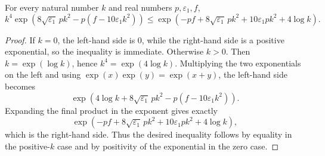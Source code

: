 \begin{helper}
For every natural number \(k\) and real numbers \(p,\varepsilon_1,f\),
\[
k^4\exp\!\left(
8\sqrt{\varepsilon_1}\,p k^2
-p(f-10\varepsilon_1 k^2)\right)
\le
\exp\!\left(
-pf+8\sqrt{\varepsilon_1}\,p k^2
+10\varepsilon_1 p k^2+4\log k\right).
\]
\end{helper}
\begin{proof}
If \(k=0\), the left-hand side is \(0\), while the right-hand side is a
positive exponential, so the inequality is immediate.  Otherwise \(k>0\).
Then \(k=\exp(\log k)\), hence \(k^4=\exp(4\log k)\).  Multiplying the two
exponentials on the left and using \(\exp(x)\exp(y)=\exp(x+y)\), the left-hand
side becomes
\[
\exp\!\left(
4\log k+8\sqrt{\varepsilon_1}\,p k^2
-p(f-10\varepsilon_1k^2)\right).
\]
Expanding the final product in the exponent gives exactly
\[
\exp\!\left(
-pf+8\sqrt{\varepsilon_1}\,p k^2
+10\varepsilon_1 p k^2+4\log k\right),
\]
which is the right-hand side.  Thus the desired inequality follows by equality
in the positive-\(k\) case and by positivity of the exponential in the zero
case.
\end{proof}
